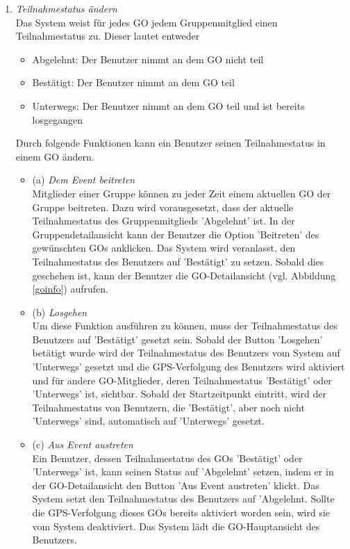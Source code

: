 \documentclass[parskip=full]{scrartcl}
\def\threedigits#1{%
  \ifnum#1<100 0\fi
  \ifnum#1<10 0\fi
  \number#1}
\begin{document}
\begin{enumerate}[label={\textbf{/F\protect\threedigits{\theenumi}0/}}, leftmargin=*, resume]
	\item \textit{Teilnahmestatus ändern}\label{Teilnahmestatus} \\
	Das System weist für jedes GO jedem Gruppenmitglied einen Teilnahmestatus zu. Dieser lautet entweder
	\begin{itemize}
		\item Abgelehnt: Der Benutzer nimmt an dem GO nicht teil
		\item Bestätigt: Der Benutzer nimmt an dem GO teil
		\item Unterwegs: Der Benutzer nimmt an dem GO teil und ist bereits losgegangen
	\end{itemize}
Durch folgende Funktionen kann ein Benutzer seinen Teilnahmestatus in einem GO ändern.

	\begin{itemize}
	\item (a) \textit{Dem Event beitreten} \label{GO-Anfrage} \\
	Mitglieder einer Gruppe können zu jeder Zeit einem aktuellen GO der Gruppe beitreten. Dazu wird vorausgesetzt, dass der aktuelle Teilnahmestatus des Gruppenmitglieds 'Abgelehnt' ist. In der Gruppendetailansicht kann der Benutzer die Option 'Beitreten' des gewünschten GOs anklicken. Das System wird  veranlasst, den Teilnahmestatus des Benutzers auf 'Bestätigt' zu setzen. Sobald dies geschehen ist, kann der Benutzer die GO-Detailansicht (vgl. Abbildung \ref{goinfo}) aufrufen.
	
	\item (b) \textit{Losgehen}\label{losgehen} \\
	Um diese Funktion ausführen zu können, muss der Teilnahmestatus des Benutzers auf 'Bestätigt' gesetzt sein. Sobald der Button 'Losgehen' betätigt wurde wird der Teilnahmestatus des Benutzers vom System auf 'Unterwegs' gesetzt und die GPS-Verfolgung des Benutzers wird aktiviert und für andere GO-Mitglieder, deren Teilnahmestatus 'Bestätigt' oder 'Unterwegs' ist, sichtbar. Sobald der Startzeitpunkt eintritt, wird der Teilnahmestatus von Benutzern, die 'Bestätigt', aber noch nicht 'Unterwegs' sind, automatisch auf 'Unterwegs' gesetzt.
	
	\item (c) \textit{Aus Event austreten}\label{austreten} \\
Ein Benutzer, dessen Teilnahmestatus des GOs 'Bestätigt' oder 'Unterwegs' ist, kann seinen Status auf 'Abgelehnt' setzen, indem er in der GO-Detailansicht den Button 'Aus Event austreten' klickt. Das System setzt den Teilnahmestatus des Benutzers auf 'Abgelehnt. Sollte die GPS-Verfolgung dieses GOs bereits aktiviert worden sein, wird sie vom System deaktiviert. Das System lädt die GO-Hauptansicht des Benutzers.
	

\end{itemize}
\end{enumerate}
\end{document}
